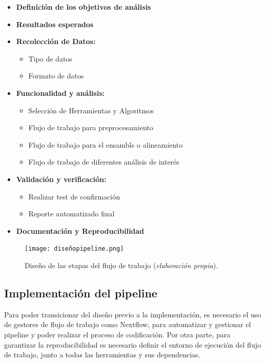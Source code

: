 \documentclass[12pt]{article}
\begin{document}
\begin{itemize}
    \item \textbf{Definición de los objetivos de análisis}
    \item \textbf{Resultados esperados}
    \item \textbf{Recolección de Datos:}
    \begin{itemize}
        \item Tipo de datos
        \item Formato de datos
    \end{itemize}
    \item \textbf{Funcionalidad y análisis:}
    \begin{itemize}
        \item Selección de Herramientas y Algoritmos
        \item Flujo de trabajo para preprocesamiento
        \item Flujo de trabajo para el ensamble o alineamiento
        \item Flujo de trabajo de diferentes análisis de interés
    \end{itemize}
    \item \textbf{Validación y verificación:}
    \begin{itemize}
        \item Realizar test de confirmación
        \item Reporte automatizado final
    \end{itemize}
    \item \textbf{Documentación y Reproducibilidad}
\end{itemize}

\begin{figure}[ht!]
    \centering
    \small
    \texttt{[image: diseñopipeline.png]}
    \caption{Diseño de las etapas del flujo de trabajo (\emph{elaboración propia}).}
    \label{fig:disenopipeline}
\end{figure}

\subsection*{Implementación del pipeline}

Para poder transicionar del diseño previo a la implementación, es 
necesario el uso de gestores de flujo de trabajo como Nextflow, 
para automatizar y gestionar el pipeline y poder realizar el 
proceso de codificación. Por otra parte, para garantizar la 
reproducibilidad es necesario definir el entorno de ejecución 
del flujo de trabajo, junto a todas las herramientas y sus 
dependencias.
\end{document}
